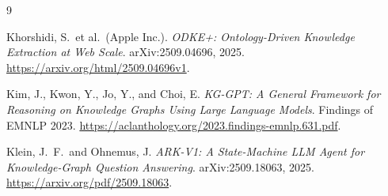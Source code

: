 \documentclass[11pt,a4paper]{article}
\begin{document}
\begin{thebibliography}{9}

Khorshidi, S.\ et al.\ (Apple Inc.).
\newblock \emph{ODKE+: Ontology-Driven Knowledge Extraction at Web Scale}.
\newblock arXiv:2509.04696, 2025.
\newblock \url{https://arxiv.org/html/2509.04696v1}.

Kim, J., Kwon, Y., Jo, Y., and Choi, E.
\newblock \emph{KG-GPT: A General Framework for Reasoning on Knowledge Graphs
Using Large Language Models}.
\newblock Findings of EMNLP 2023.
\newblock \url{https://aclanthology.org/2023.findings-emnlp.631.pdf}.

Klein, J.\ F.\ and Ohnemus, J.
\newblock \emph{ARK-V1: A State-Machine LLM Agent for Knowledge-Graph
Question Answering}.
\newblock arXiv:2509.18063, 2025.
\newblock \url{https://arxiv.org/pdf/2509.18063}.

\end{thebibliography}
\end{document}
